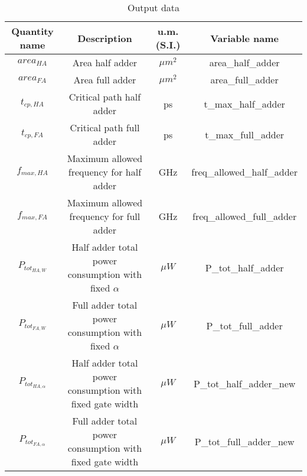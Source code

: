 \begin{table}[htbp]
	\begin{center}
		\begin{tabular}{|c|c|c|c|} \hline
			\textbf{Quantity name} & \textbf{Description} & \textbf{u.m. (S.I.)} & \textbf{Variable name} \\ \hline
			$area_{HA}$ & Area half adder & $\mu m^2$ & area\_half\_adder \\
			$area_{FA}$ & Area full adder & $\mu m^2$ & area\_full\_adder \\
			$t_{cp,HA}$ & Critical path half adder & ps & t\_max\_half\_adder \\
			$t_{cp,FA}$ & Critical path full adder & ps & t\_max\_full\_adder \\
			$f_{max,HA}$ & Maximum allowed frequency for half adder & GHz & freq\_allowed\_half\_adder \\
			$f_{max,FA}$ & Maximum allowed frequency for full adder & GHz & freq\_allowed\_full\_adder \\
			$P_{tot_{HA,W}}$ & Half adder total power consumption with fixed $\alpha$ & $\mu W$ & P\_tot\_half\_adder \\
			$P_{tot_{FA,W}}$ & Full adder total power consumption with fixed $\alpha$ & $\mu W$ & P\_tot\_full\_adder \\
			$P_{tot_{HA,\alpha}}$ & Half adder total power consumption with fixed gate width & $\mu W$ & P\_tot\_half\_adder\_new \\
			$P_{tot_{FA,\alpha}}$ & Full adder total power consumption with fixed gate width & $\mu W$ & P\_tot\_full\_adder\_new \\ \hline
		\end{tabular}
	\end{center}
	\caption{Output data}
	\label{tab_out_data}
\end{table}